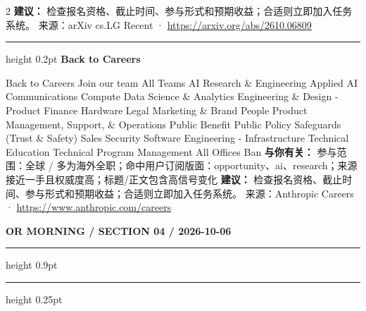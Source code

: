 \documentclass[10.5pt]{ctexart}
\begin{document}
\begin{multicols}{2}
\textbf{建议：} 检查报名资格、截止时间、参与形式和预期收益；合适则立即加入任务系统。
{\footnotesize\color{ormuted} 来源：arXiv cs.LG Recent · \url{https://arxiv.org/abs/2610.06809}}
\vspace{2mm}
\hrule height 0.2pt
\vspace{2mm}
{\large\bfseries Back to Careers}\par
Back to Careers Join our team All Teams AI Research \& Engineering Applied AI Communications Compute Data Science \& Analytics Engineering \& Design - Product Finance Hardware Legal Marketing \& Brand People Product Management, Support, \& Operations Public Benefit Public Policy Safeguards (Trust \& Safety) Sales Security Software Engineering - Infrastructure Technical Education Technical Program Management All Offices Ban
\textbf{与你有关：} 参与范围：全球 / 多为海外全职；命中用户订阅版面：opportunity、ai、research；来源接近一手且权威度高；标题/正文包含高信号变化
\textbf{建议：} 检查报名资格、截止时间、参与形式和预期收益；合适则立即加入任务系统。
{\footnotesize\color{ormuted} 来源：Anthropic Careers · \url{https://www.anthropic.com/careers}}
\end{multicols}
\newpage
{\small\bfseries OR MORNING / SECTION 04 / 2026-10-06}
\vspace{2mm}
\hrule height 0.9pt
\vspace{1.5mm}
\hrule height 0.25pt
\vspace{4mm}
\end{document}
